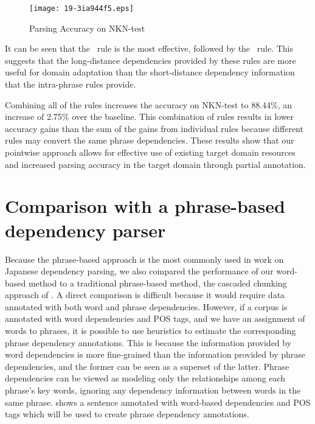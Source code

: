 \documentclass[english]{jnlp_1.4}
\def\figref#1{}
\def\ruleL{}
\def\ruleP{}
\begin{document}
\begin{figure}[b]
  \begin{center}
  \texttt{[image: 19-3ia944f5.eps]}
  \end{center}
  \caption{Parsing Accuracy on NKN-test}
  \label{figure:rules}
\end{figure}

It can be seen that the \ruleL \ rule is the most effective, followed by the \ruleP \ rule. This suggests that the
long-distance dependencies provided by these rules are more useful for domain adaptation than the
short-distance dependency information that the intra-phrase rules provide.


Combining all of the rules increases the accuracy on NKN-test to 88.44\%, an increase of
2.75\% over the baseline. This combination of rules results in lower accuracy gains than the sum of the
gains from individual rules because different rules may convert the same phrase dependencies. These
results show that our pointwise approach allows for effective use of existing target domain
resources and increased parsing accuracy in the target domain through partial annotation.



\section{Comparison with a phrase-based dependency parser}
\label{sec:comp-with-phrase}

Because the phrase-based approach is the most commonly used in work on
Japanese dependency parsing, we also compared the performance of our
word-based method to a traditional phrase-based method, the cascaded
chunking approach of . A direct comparison is
difficult because it would require data annotated with both word and
phrase dependencies. However, if a corpus is annotated with word
dependencies and POS tags, and we have an assignment of words to
phrases, it is possible to use heuristics to estimate the corresponding phrase
dependency annotations. This is because the information provided by
word dependencies is more fine-grained than the information provided
by phrase dependencies, and the former can be seen as a superset of
the latter. Phrase dependencies can be viewed as modeling only the
relationships among each phrase's key words, ignoring any dependency
information between words in the same
phrase. \figref{figure:word_cabocha} shows a sentence annotated with
word-based dependencies and POS tags which will be used to create
phrase dependency annotations.
\end{document}
